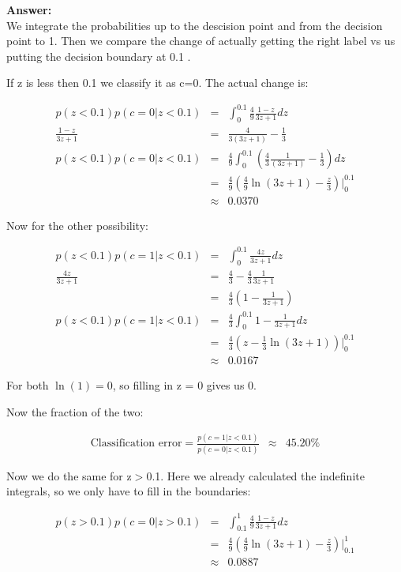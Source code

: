 \documentclass[a4paper]{article}
\begin{document}
\textbf{Answer:}\\


We integrate the probabilities up to the descision point and from the decision point to 1. Then we compare the change of actually getting the right label vs us putting the decision boundary at 0.1 . 


If z is less then 0.1 we classify it as c=0. The actual change is:

\begin{eqnarray}
p(z<0.1)p(c=0|z<0.1) &=& \int_0^{0.1} \frac{4}{9}\frac{1-z}{3z+1}dz\\
\frac{1-z}{3z+1} &=&  \frac{4}{3(3z+1)} - \frac{1}{3}\\
p(z<0.1)p(c=0|z<0.1) &=& \frac{4}{9} \int_0^{0.1} \left ( \frac{4}{3} \frac{1}{(3z+1)} - \frac{1}{3}\right )dz\\
&=& \frac{4}{9} \left ( \frac{4}{9} \ln(3z+1) - \frac{z}{3}  \right )\Bigg | _0^{0.1}\\
&\approx &  0.0370 
\end{eqnarray}

Now for the other possibility:


\begin{eqnarray}
p(z<0.1)p(c=1|z<0.1) &=& \int_0^{0.1} \frac{4z}{3z+1} dz\\
\frac{4z}{3z+1} &=& \frac{4}{3}-  \frac{4}{3}\frac{1}{3z+1}\\
&=& \frac{4}{3}\left ( 1 - \frac{1}{3z+1}\right )\\
p(z<0.1)p(c=1|z<0.1) &=& \frac{4}{3}\int_0^{0.1} 1 - \frac{1}{3z+1}dz\\
&=& \frac{4}{3}\left (z - \frac{1}{3} \ln(3z+1)\right ) \Bigg |_0^{0.1}\\
&\approx & 0.0167 
\end{eqnarray}


For both $\ln(1) = 0$, so filling in z = 0 gives us 0. 

Now the fraction of the two:


\begin{eqnarray}
\text{Classification error} = \frac{p(c=1|z<0.1)}{p(c=0|z<0.1)} &\approx & 45.20 \% 
\end{eqnarray}

Now we do the same for z$>$0.1. Here we already calculated the indefinite integrals, so we only have to fill in the boundaries:


\begin{eqnarray}
p(z>0.1)p(c=0|z>0.1) &=& \int_{0.1}^1 \frac{4}{9}\frac{1-z}{3z+1}dz\\
&=& \frac{4}{9} \left ( \frac{4}{9} \ln(3z+1) - \frac{z}{3}  \right )\Bigg | _{0.1}^{1}\\
&\approx & 0.0887
\end{eqnarray}
\end{document}

